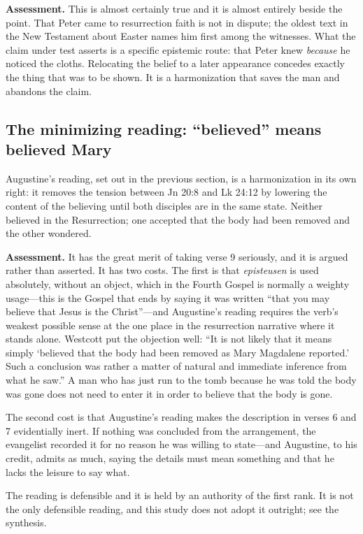 \textbf{Assessment.} This is almost certainly true and it is almost entirely
beside the point. That Peter came to resurrection faith is not in dispute; the
oldest text in the New Testament about Easter names him first among the
witnesses. What the claim under test asserts is a specific epistemic route:
that Peter knew \emph{because} he noticed the cloths. Relocating the belief to
a later appearance concedes exactly the thing that was to be shown. It is a
harmonization that saves the man and abandons the claim.

\subsection{The minimizing reading: ``believed'' means believed Mary}

Augustine's reading, set out in the previous section, is a harmonization in its
own right: it removes the tension between Jn 20:8 and Lk 24:12 by lowering the
content of the believing until both disciples are in the same state. Neither
believed in the Resurrection; one accepted that the body had been removed and
the other wondered.

\textbf{Assessment.} It has the great merit of taking verse 9 seriously, and it
is argued rather than asserted. It has two costs. The first is that
\emph{episteusen} is used absolutely, without an object, which in the Fourth
Gospel is normally a weighty usage---this is the Gospel that ends by saying it
was written ``that you may believe that Jesus is the Christ''---and Augustine's
reading requires the verb's weakest possible sense at the one place in the
resurrection narrative where it stands alone. Westcott put the objection well:
``It is not likely that it means simply `believed that the body had been removed
as Mary Magdalene reported.' Such a conclusion was rather a matter of natural
and immediate inference from what he saw.'' A man who has just run to the tomb
because he was told the body was gone does not need to enter it in order to
believe that the body is gone.

The second cost is that Augustine's reading makes the description in verses 6
and 7 evidentially inert. If nothing was concluded from the arrangement, the
evangelist recorded it for no reason he was willing to state---and Augustine,
to his credit, admits as much, saying the details must mean something and that
he lacks the leisure to say what.

The reading is defensible and it is held by an authority of the first rank. It
is not the only defensible reading, and this study does not adopt it outright;
see the synthesis.

